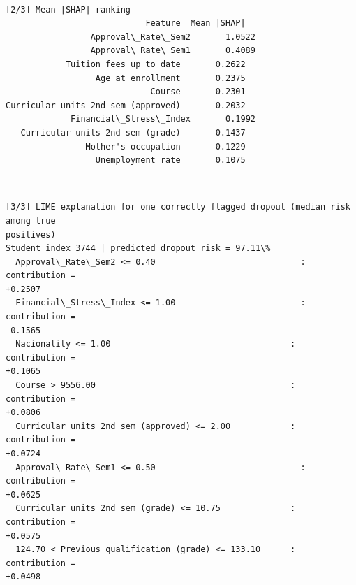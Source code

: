 \documentclass[11pt]{article}
\begin{document}
    \begin{center}
    \end{center}
    { \hspace*{\fill} \\}
    
    \begin{Verbatim}[commandchars=\\\{\}]
[2/3] Mean |SHAP| ranking
                            Feature  Mean |SHAP|
                 Approval\_Rate\_Sem2       1.0522
                 Approval\_Rate\_Sem1       0.4089
            Tuition fees up to date       0.2622
                  Age at enrollment       0.2375
                             Course       0.2301
Curricular units 2nd sem (approved)       0.2032
             Financial\_Stress\_Index       0.1992
   Curricular units 2nd sem (grade)       0.1437
                Mother's occupation       0.1229
                  Unemployment rate       0.1075
    \end{Verbatim}

    \begin{center}
    \end{center}
    { \hspace*{\fill} \\}
    
    \begin{Verbatim}[commandchars=\\\{\}]
[3/3] LIME explanation for one correctly flagged dropout (median risk among true
positives)
Student index 3744 | predicted dropout risk = 97.11\%
  Approval\_Rate\_Sem2 <= 0.40                             : contribution =
+0.2507
  Financial\_Stress\_Index <= 1.00                         : contribution =
-0.1565
  Nacionality <= 1.00                                    : contribution =
+0.1065
  Course > 9556.00                                       : contribution =
+0.0806
  Curricular units 2nd sem (approved) <= 2.00            : contribution =
+0.0724
  Approval\_Rate\_Sem1 <= 0.50                             : contribution =
+0.0625
  Curricular units 2nd sem (grade) <= 10.75              : contribution =
+0.0575
  124.70 < Previous qualification (grade) <= 133.10      : contribution =
+0.0498
    \end{Verbatim}
\end{document}
